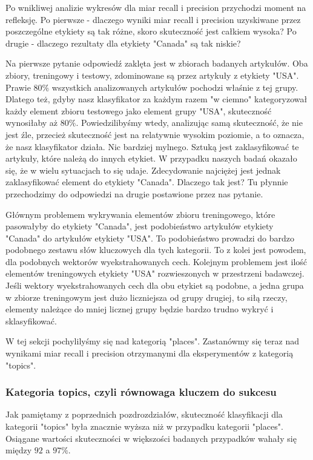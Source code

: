 \documentclass{classrep}
\begin{document}
Po wnikliwej analizie wykresów dla miar recall i precision przychodzi moment na refleksję. Po pierwsze - dlaczego wyniki miar recall i precision uzyskiwane przez poszczególne etykiety są tak różne, skoro skuteczność jest całkiem wysoka? Po drugie - dlaczego rezultaty dla etykiety "Canada" są tak niskie?\newline

Na pierwsze pytanie odpowiedź zaklęta jest w zbiorach badanych artykułów. Oba zbiory, treningowy i testowy, zdominowane są przez artykuły z etykiety "USA". Prawie $80\%$ wszystkich analizowanych artykułów pochodzi właśnie z tej grupy. Dlatego też, gdyby nasz klasyfikator za każdym razem "w ciemno" kategoryzował każdy element zbioru testowego jako element grupy "USA", skuteczność wynosiłaby aż $80\%$. Powiedzilibyśmy wtedy, analizując samą skuteczność, że nie jest źle, przecież skuteczność jest na relatywnie wysokim poziomie, a to oznacza, że nasz klasyfikator działa. Nic bardziej mylnego. Sztuką jest zaklasyfikować te artykuły, które należą do innych etykiet. W przypadku naszych badań okazało się, że w wielu sytuacjach to się udaje. Zdecydowanie najciężej jest jednak zaklasyfikować element do etykiety "Canada". Dlaczego tak jest? Tu płynnie przechodzimy do odpowiedzi na drugie postawione przez nas pytanie.\newline

Głównym problemem wykrywania elementów zbioru treningowego, które pasowałyby do etykiety "Canada", jest podobieństwo artykułów etykiety "Canada" do artykułów etykiety "USA". To podobieństwo prowadzi do bardzo podobnego zestawu słów kluczowych dla tych kategorii. To z kolei jest powodem, dla podobnych wektorów wyekstrahowanych cech. Kolejnym problemem jest ilość elementów treningowych etykiety "USA" rozwieszonych w przestrzeni badawczej. Jeśli wektory wyekstrahowanych cech dla obu etykiet są podobne, a jedna grupa w zbiorze treningowym jest dużo liczniejsza od grupy drugiej, to siłą rzeczy, elementy należące do mniej licznej grupy będzie bardzo trudno wykryć i sklasyfikować.\newline

W tej sekcji pochylilyśmy się nad kategorią "places". Zastanówmy się teraz nad wynikami miar recall i precision otrzymanymi dla eksperymentów z kategorią "topics".

\subsubsection{Kategoria topics, czyli równowaga kluczem do sukcesu}
Jak pamiętamy z poprzednich pozdrozdziałów, skuteczność klasyfikacji dla kategorii "topics" była znacznie wyższa niż w przypadku kategorii "places". Osiągane wartości skuteczności w większości badanych przypadków wahały się między $92$ a $97\%$.\newline
\end{document}
